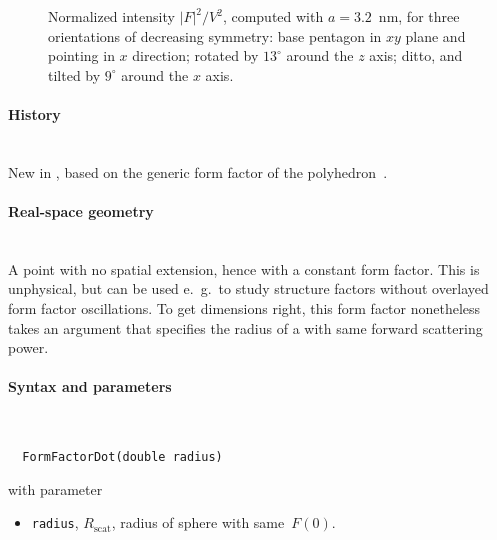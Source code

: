 \begin{figure}[H]
\begin{center}
\end{center}
\caption{Normalized intensity $|F|^2/V^2$,
computed with $a=3.2$~nm,
for three orientations of decreasing symmetry:
base pentagon in $xy$ plane and pointing in $x$ direction;
rotated by $13^\circ$ around the $z$ axis;
ditto, and tilted by $9^\circ$ around the $x$ axis.}
\end{figure}

\paragraph{History}\strut\\
New in ,
based on the generic form factor of the polyhedron~\cite{Wut17}.


 \label{SDot}

\paragraph{Real-space geometry}\strut\\

A point with no spatial extension,
hence with a constant form factor.
This is unphysical,
but can be used e.~g.\ to study structure factors without overlayed form factor oscillations.
To get dimensions right, this form factor nonetheless takes an argument
that specifies the radius of a  with same forward scattering power.

\FloatBarrier

\paragraph{Syntax and parameters}\strut\\[-2ex plus .2ex minus .2ex]
\begin{lstlisting}
  FormFactorDot(double radius)
\end{lstlisting}
with parameter
\begin{itemize}
\item \texttt{radius}, $R_\text{scat}$, radius of sphere with same~$F(0)$.
\end{itemize}


